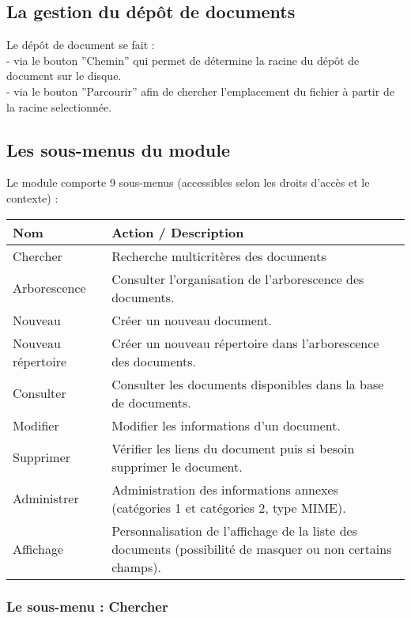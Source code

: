 \subsection{La gestion du dépôt de documents}

Le dépôt de document se fait :\\
- via le bouton ''Chemin'' qui permet de détermine la racine du dépôt de document sur le disque.\\
- via le bouton ''Parcourir'' afin de chercher l'emplacement du fichier à partir de la racine selectionnée.\\

\subsection{Les sous-menus du module \doc}

Le module \doc comporte 9 sous-menus (accessibles selon les droits d'accès et le contexte) :\\

\begin{tabular}{|p{2.5cm}|p{9.5cm}|}
\hline
\textbf{Nom} & \textbf{Action / Description} \\
\hline
Chercher & Recherche multicritères des documents \\
\hline
Arborescence & Consulter l'organisation de l'arborescence des documents.\\
\hline
Nouveau & Créer un nouveau document.\\
\hline
Nouveau répertoire & Créer un nouveau répertoire dans l'arborescence des documents.\\
\hline
Consulter & Consulter les documents disponibles dans la base de documents.\\
\hline
Modifier & Modifier les informations d'un document.\\
\hline
Supprimer & Vérifier les liens du document puis si besoin supprimer le document.\\
\hline
Administrer & Administration des informations annexes (catégories 1 et catégories 2, type MIME).\\
\hline
Affichage & Personnalisation de l'affichage de la liste des documents (possibilité de masquer ou non certains champs).\\
\hline
\end{tabular}


\subsubsection{Le sous-menu : Chercher}

